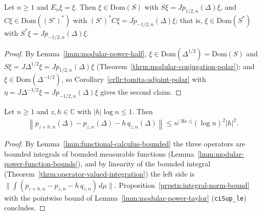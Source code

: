 \begin{corollary}
    \label{crllr:modular-H0-tomita-domains}
    \leanok
    Let $n \ge 1$ and $E_n\xi = \xi$. Then $\xi \in \text{Dom}(S)$ with $S\xi = Jp_{1/2,n}(\Delta)\xi$, and $C\xi \in \text{Dom}((S')^*)$ with $(S')^*C\xi = Jp_{-1/2,n}(\Delta)\xi$; that is, $\xi \in \text{Dom}(S^*)$ with $S^*\xi = Jp_{-1/2,n}(\Delta)\xi$.
\end{corollary}
\begin{proof}
    \leanok
    By Lemma~\ref{lmm:modular-power-half}, $\xi \in \text{Dom}(\Delta^{1/2}) = \text{Dom}(S)$ and $S\xi = J\Delta^{1/2}\xi = Jp_{1/2,n}(\Delta)\xi$ (Theorem~\ref{thrm:modular-conjugation-polar}); and $\xi \in \text{Dom}(\Delta^{-1/2})$, so Corollary~\ref{crllr:tomita-adjoint-polar} with $\eta = J\Delta^{-1/2}\xi = Jp_{-1/2,n}(\Delta)\xi$ gives the second claim.
\end{proof}

\begin{lemma}
    \label{lmm:modular-power-difference-bound}
    \leanok
    Let $n \ge 1$ and $z, h \in \mathbb{C}$ with $|h|\log n \le 1$. Then
    \begin{align}
        \left\| p_{z+h,n}(\Delta) - p_{z,n}(\Delta) - h\,q_{z,n}(\Delta) \right\| \le n^{|\operatorname{Re} z|}(\log n)^2|h|^2.
    \end{align}
\end{lemma}
\begin{proof}
    \leanok
    By Lemma~\ref{lmm:functional-calculus-bounded} the three operators are bounded integrals of bounded measurable functions (Lemma~\ref{lmm:modular-power-function-bounds}), and by linearity of the bounded integral (Theorem~\ref{thrm:operator-valued-integration}) the left side is $\|\int (p_{z+h,n} - p_{z,n} - h\,q_{z,n}) \, d\mu\|$. Proposition~\ref{prpstn:integral-norm-bound} with the pointwise bound of Lemma~\ref{lmm:modular-power-taylor} (\texttt{ciSup\_le}) concludes.
\end{proof}

